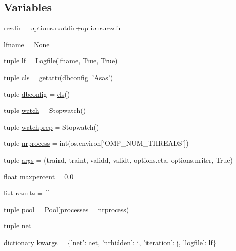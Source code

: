 \subsection*{Variables}
\begin{DoxyCompactItemize}
\item 
\hyperlink{namespacetrainnetmp_ab566ffaeaa6913a2b2b347cff1a608a4}{resdir} = options.rootdir+options.resdir
\item 
\hyperlink{namespacetrainnetmp_a9ebecee08a7b0aefef2e0b192e970bda}{lfname} = None
\item 
tuple \hyperlink{namespacetrainnetmp_ac6c0cf0d61312a5dbd34443a74310689}{lf} = Logfile(\hyperlink{namespacetrainnetmp_a9ebecee08a7b0aefef2e0b192e970bda}{lfname}, True, True)
\item 
tuple \hyperlink{namespacetrainnetmp_ad12ea3655cd42b916f85fcedd267ad16}{cls} = getattr(\hyperlink{namespacetrainnetmp_a5b13bd831f315c6820696cabf93a0d85}{dbconfig}, 'Asas')
\item 
tuple \hyperlink{namespacetrainnetmp_a5b13bd831f315c6820696cabf93a0d85}{dbconfig} = \hyperlink{namespacetrainnetmp_ad12ea3655cd42b916f85fcedd267ad16}{cls}()
\item 
tuple \hyperlink{namespacetrainnetmp_ad0c5cbbe64c5ef22afe865ff2f038740}{watch} = Stopwatch()
\item 
tuple \hyperlink{namespacetrainnetmp_a0207abb6efd09545a76548318d6af4cf}{watchprep} = Stopwatch()
\item 
tuple \hyperlink{namespacetrainnetmp_a0ce23022a012fafdc81c769f9ea2ae84}{nrprocess} = int(os.environ\mbox{[}'OMP\_\-NUM\_\-THREADS'\mbox{]})
\item 
tuple \hyperlink{namespacetrainnetmp_aa0c8c776c3d1db6ced2d652b6ef39cec}{args} = (traind, traint, validd, validt, options.eta, options.nriter, True)
\item 
float \hyperlink{namespacetrainnetmp_ae484804d6f3c2525ab89fc23b715d8d0}{maxpercent} = 0.0
\item 
list \hyperlink{namespacetrainnetmp_acf60722e6b94f8b6613aff40c374d19f}{results} = \mbox{[}$\,$\mbox{]}
\item 
tuple \hyperlink{namespacetrainnetmp_a03c784c70244aab9be7a7f087f99f1e8}{pool} = Pool(processes = \hyperlink{namespacetrainnetmp_a0ce23022a012fafdc81c769f9ea2ae84}{nrprocess})
\item 
tuple \hyperlink{namespacetrainnetmp_abc8273df12ede80d1022efecac2e6883}{net}
\item 
dictionary \hyperlink{namespacetrainnetmp_afecb97f9f28c04c9cce1e3342010cd53}{kwargs} = \{'\hyperlink{namespacetrainnetmp_abc8273df12ede80d1022efecac2e6883}{net}': \hyperlink{namespacetrainnetmp_abc8273df12ede80d1022efecac2e6883}{net}, 'nrhidden': i, 'iteration': j, 'logfile': \hyperlink{namespacetrainnetmp_ac6c0cf0d61312a5dbd34443a74310689}{lf}\}

\end{DoxyCompactItemize}
